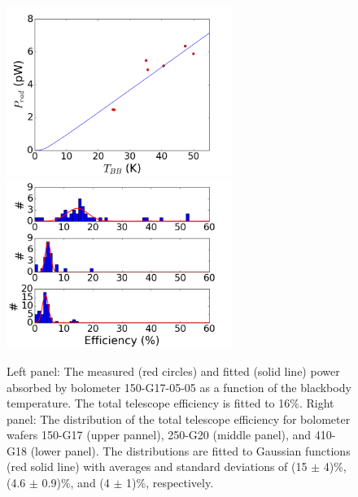 \documentclass[../EBEXPaper2.tex]{subfiles}
\begin{document}
\begin{figure}[htbp]
\centering
\includegraphics[height={5.5cm}]{images/detectors_and_readout/150-05-05}%
\hfil
\includegraphics[height={5.5cm}]{images/detectors_and_readout/hist_efficiency_BB}%
\caption{Left panel: The measured (red circles) and fitted (solid line) power absorbed by bolometer 150-G17-05-05 as a function of the blackbody temperature.
The total telescope efficiency is fitted to 16\%.%
Right panel: The distribution of the total telescope efficiency for bolometer wafers 150-G17 (upper pannel), 250-G20 (middle panel), and 410-G18 (lower panel).
The distributions are fitted to Gaussian functions (red solid line) with averages and standard deviations of (15 $\pm$ 4)\%, (4.6 $\pm$ 0.9)\%, and (4 $\pm$ 1)\%, respectively.%
}
\label{fig:efficiency}
\end{figure}
\end{document}
